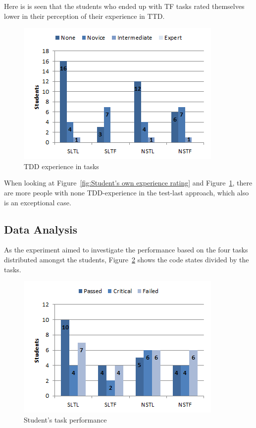 \documentclass{sig-alternate-05-2015}
\begin{document}
Here is is seen that the students who ended up with TF tasks rated themselves lower in their perception of their experience in TTD.

\begin{figure}[!ht]
	\centering
	\includegraphics[width=1\linewidth]{img04}
	\caption{TDD experience in tasks}
	\label{fig:TDD experience in tasks}
\end{figure}

When looking at Figure~\ref{fig:Student's own experience rating} and Figure~\ref{fig:TDD experience in tasks}, there are more people with none TDD-experience in the test-last approach, which also is an exceptional case.

\subsection{Data Analysis}
\label{DataAnalysis}
As the experiment aimed to investigate the performance based on the four tasks distributed amongst the students, Figure~\ref{fig:Student's task performance} shows the code states divided by the tasks.

\begin{figure}[!ht]
	\centering
	\includegraphics[width=1\linewidth]{img05}
	\caption{Student's task performance}
	\label{fig:Student's task performance}
\end{figure}
\end{document}
